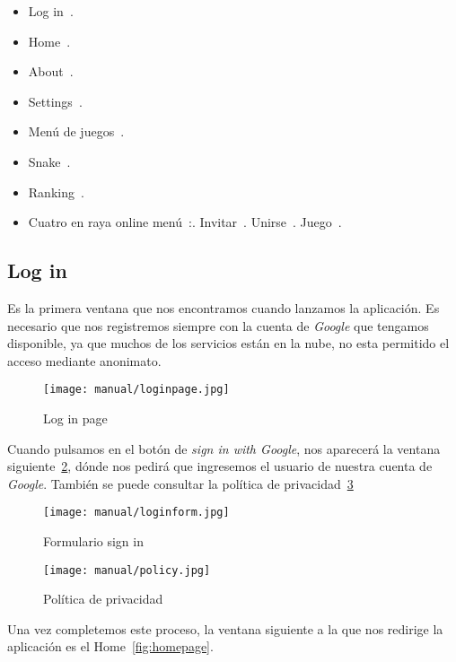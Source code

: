 \begin{itemize}
	\tightlist
	\item Log in~\pageref{login}.
	\item Home~\pageref{home}.
	\item About~\pageref{about}.
	\item Settings~\pageref{settings}.
	\item Menú de juegos~\pageref{menugames}.
	\item Snake~\pageref{snake}.
	\item Ranking~\pageref{rank}.
	\item Cuatro en raya online menú~\pageref{cuatromenu}:.
	\subitem Invitar~\pageref{cuatroinvitar}.
	\subitem Unirse~\pageref{cuatrounir}.
	\subitem Juego~\pageref{cuatrojuego}.
\end{itemize}

\subsection{Log in}\label{login}
Es la primera ventana que nos encontramos cuando lanzamos la aplicación. Es necesario que nos registremos siempre con la cuenta de \emph{Google} que tengamos disponible, ya que muchos de los servicios están en la nube, no esta permitido el acceso mediante anonimato.

\begin{figure}[H]
	\centering
	\texttt{[image: manual/loginpage.jpg]}
	\caption{Log in page}\label{fig:loginpage}
\end{figure}

Cuando pulsamos en el botón de \emph{sign in with Google}, nos aparecerá la ventana siguiente~\ref{fig:formlog}, dónde nos pedirá que ingresemos el usuario de nuestra cuenta de \emph{Google}. También se puede consultar la política de privacidad~\ref{fig:policy}

\begin{figure}[H]
	\centering
	\texttt{[image: manual/loginform.jpg]}
	\caption{Formulario sign in}\label{fig:formlog}
\end{figure}

\begin{figure}[H]
	\centering
	\texttt{[image: manual/policy.jpg]}
	\caption{Política de privacidad}\label{fig:policy}
\end{figure}

Una vez completemos este proceso, la ventana siguiente a la que nos redirige la aplicación es el Home~\ref{fig:homepage}.


